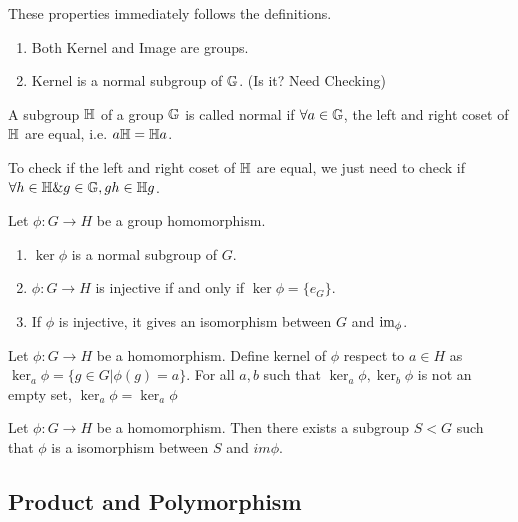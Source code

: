 \documentclass[../note.tex]{subfiles}
\begin{document}
\begin{theorem}
	These properties immediately follows the definitions.
	\begin{enumerate}
		\item Both Kernel and Image are groups.
		\item Kernel is a normal subgroup of $\mathbb{G}$. (Is it? Need Checking)
	\end{enumerate}
\end{theorem}

\begin{definition}
	A subgroup $\mathbb{H}$ of a group $\mathbb{G}$ is called normal if $\forall a \in \mathbb{G}$, the left and right coset of $\mathbb{H}$ are equal, i.e. $a \mathbb{H}=\mathbb{H}a$.
\end{definition}

To check if the left and right coset of $\mathbb{H}$ are equal, we just need to check if $\forall h \in \mathbb{H} \& g \in \mathbb{G}, gh \in \mathbb{H}g$.

\begin{theorem}
	Let $\phi : G \rightarrow H$ be a group homomorphism.
\begin{enumerate}
	\item $\ker{\phi}$ is a normal subgroup of $G$. 
	\item $\phi: G \rightarrow H$ is injective if and only if $\ker{\phi} = \{e_{G}\}$.
	\item If $\phi$ is injective, it gives an isomorphism between $G$ and $\text{im}_{\phi}$.
\end{enumerate}
\end{theorem}

\begin{hypothesis}
	Let $\phi: G \rightarrow H$ be a homomorphism.
	Define kernel of $\phi$ respect to $a \in H$ as $\ker_a{\phi}=\{g\in G| \phi(g)=a\}$.
	For all $a, b$ such that $\ker_a{\phi}, \ker_b{\phi}$ is not an empty set, $\ker_a{\phi}=\ker_a{\phi}$ 
\end{hypothesis}

\begin{hypothesis}
	Let $\phi: G \rightarrow H$ be a homomorphism. Then there exists a subgroup $S < G$ such that $\phi$ is a isomorphism between $S$ and $im \phi$.
\end{hypothesis}

\subsection{Product and Polymorphism}
\end{document}
